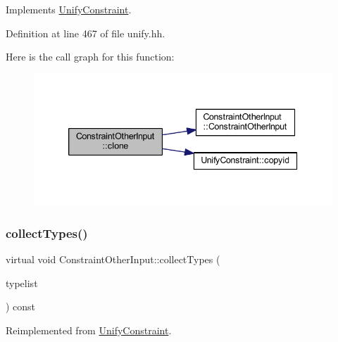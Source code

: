 Implements \mbox{\hyperlink{class_unify_constraint_a4f068343932637d355644bb21559aa12}{Unify\+Constraint}}.



Definition at line 467 of file unify.\+hh.

Here is the call graph for this function\+:
\nopagebreak
\begin{figure}[H]
\begin{center}
\leavevmode
\includegraphics[width=339pt]{class_constraint_other_input_ab28910fd3c39f0badcb49a91685a732e_cgraph}
\end{center}
\end{figure}
\mbox{\label{class_constraint_other_input_a0f02821a01359841c79cfada303770f4}} 
\subsubsection{\texorpdfstring{collectTypes()}{collectTypes()}}
{\footnotesize\ttfamily virtual void Constraint\+Other\+Input\+::collect\+Types (\begin{DoxyParamCaption}\item[{vector$<$ \mbox{\hyperlink{class_unify_datatype}{Unify\+Datatype}} $>$ \&}]{typelist }\end{DoxyParamCaption}) const\hspace{0.3cm}{\ttfamily [virtual]}}



Reimplemented from \mbox{\hyperlink{class_unify_constraint_acb83b6bea3b21e13054e72ac9cfaba0f}{Unify\+Constraint}}.

\mbox{\label{class_constraint_other_input_a5422f90baba836b389b0ba491c163e06}} 
